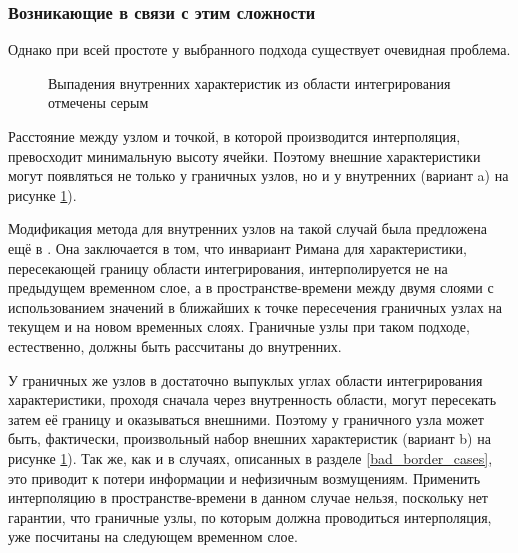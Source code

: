 \subsubsection{Возникающие в связи с этим сложности}
Однако при всей простоте у выбранного подхода существует очевидная проблема. 
\begin{figure}[H]
	\caption{Выпадения внутренних характеристик из области интегрирования отмечены серым}
	\label{pic:gcm-on-triangles-non-courant}
\end{figure}
Расстояние между узлом и точкой, в которой производится интерполяция, 
превосходит минимальную высоту ячейки. Поэтому внешние характеристики могут 
появляться не только у граничных узлов, но и у внутренних 
(вариант a) на рисунке \ref{pic:gcm-on-triangles-non-courant}). 

Модификация метода для внутренних узлов на такой случай 
была предложена ещё в \cite{magomedov_kholodov_1988}. Она заключается в том, 
что инвариант Римана для характеристики, пересекающей границу области интегрирования, 
интерполируется не на предыдущем временном слое, а в пространстве-времени между двумя 
слоями с использованием значений в ближайших к точке пересечения граничных узлах 
на текущем и на новом временных слоях. Граничные узлы при таком подходе, 
естественно, должны быть рассчитаны до внутренних.

У граничных же узлов в достаточно выпуклых углах области интегрирования характеристики, 
проходя сначала через внутренность области, могут пересекать затем её границу 
и оказываться внешними. Поэтому у граничного узла может быть, фактически, 
произвольный набор внешних характеристик 
(вариант b) на рисунке \ref{pic:gcm-on-triangles-non-courant}). 
Так же, как и в случаях, описанных в разделе \ref{bad_border_cases}, 
это приводит к потери информации и нефизичным возмущениям. Применить 
интерполяцию в пространстве-времени в данном случае нельзя, поскольку 
нет гарантии, что граничные узлы, по которым должна проводиться интерполяция, 
уже посчитаны на следующем временном слое. 

